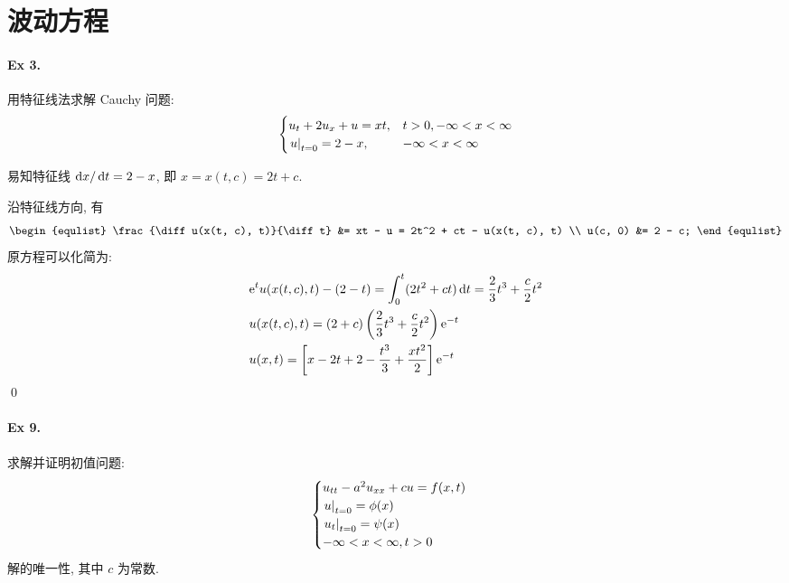 \section{波动方程}
\paragraph{Ex 3.}
用特征线法求解 Cauchy 问题:
\[ \begin{cases}
u_t + 2u_x + u = xt, & t > 0, -\infty < x < \infty \\
{\left.{u} \right|}_{t=0} = 2 - x, & -\infty < x < \infty
\end{cases} \]

\begin{solution}
易知特征线 $\operatorname{d\!} x /\operatorname{d\!} t = 2 - x$, 即 $x = x(t, c) = 2t + c$.

沿特征线方向, 有
\[ \begin{equlist}
\frac{\diff u(x(t, c), t)}{\diff t} &= xt - u = 2t^2 + ct - u(x(t, c), t) \\
    u(c, 0) &= 2 - c;
\end{equlist} \]
原方程可以化简为:
\begin{align*}
&{\mathrm e}^t u(x(t, c), t) - (2 - t) = \int_0^t (2t^2+ct)\operatorname{d\!} t
    = \frac23 t^3 + \frac{c}{2} t^2 \\
&u(x(t,c),t) = (2+c)\left(\frac23 t^3+\frac{c}{2}t^2\right){\mathrm e}^{-t} \\
&u(x,t) = \left[x - 2t+ 2 - \frac{t^3}{3}  + \frac{xt^2}{2} \right] {\mathrm e}^{-t}
\end{align*}
\qed
\end{solution}
\paragraph{Ex 9.}
求解并证明初值问题:
\[ \begin{cases}
u_{tt} - a^2 u_{xx} + cu = f(x, t) \\
{\left.{u} \right|}_{t=0} = \phi(x) \\
{\left.{u_t} \right|}_{t=0} = \psi(x) \\
-\infty < x < \infty, t > 0
\end{cases} \]
解的唯一性, 其中 $c$ 为常数.

